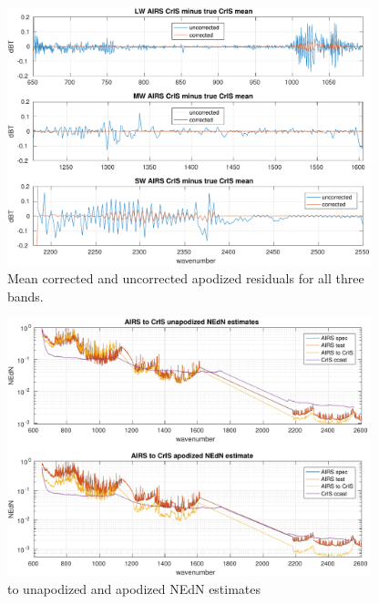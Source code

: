 \documentclass[11pt]{article}
\begin{document}
\begin{figure} %
  \centering
  \includegraphics[height=7.5cm]{figures/a2cris_regr_all.pdf}
  \caption{Mean corrected and uncorrected apodized residuals for all
    three bands.}
  \label{statall}
\end{figure}

\begin{figure} %
  \centering
  \includegraphics[height=7.5cm]{figures/a2cris_nedn.pdf}
  \caption{{\airs} to {\cris} unapodized and apodized NEdN
    estimates}
  \label{nedn}
\end{figure}
\end{document}
